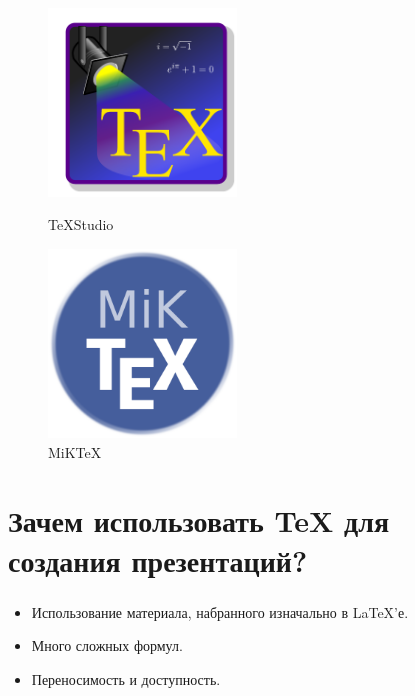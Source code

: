 \documentclass[russian, 14pt]{beamer}
\begin{document}
\begin{frame}
	\frametitle{\insertsection}
\begin{figure}[h]
	\begin{center}
		\begin{minipage}[h]{0.4\linewidth}
			\includegraphics[width=5cm,height=5cm]{tex.pdf}
			\caption*{\huge{TeXStudio}}
		\end{minipage}
		\hfill											
		\begin{minipage}[h]{0.4\linewidth}
			\includegraphics[width=5cm,height=5cm]{miktex.pdf}
			\caption*{\huge{MiKTeX}}
		\end{minipage}
	\end{center}
\end{figure}
\end{frame}

\section{Зачем использовать \TeX \: для создания презентаций?}

\begin{frame}
	\frametitle{\insertsection}
	\begin{itemize}
		\item[\textbullet] Использование материала, набранного изначально в \LaTeX'е. 
		\item[\textbullet] Много сложных формул.
		\item[\textbullet] Переносимость и доступность. 
	\end{itemize}
\end{frame}
\end{document}
